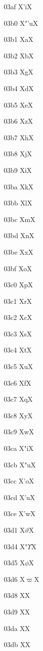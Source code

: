 \documentclass[11pt]{article}
\begin{document}
03af X{\textgreek{'i}}X

03b0 X{\textgreek{"'u}}X

03b1 X{\textgreek{a}}X

03b2 X{\textgreek{b}}X

03b3 X{\textgreek{g}}X

03b4 X{\textgreek{d}}X

03b5 X{\textgreek{e}}X

03b6 X{\textgreek{z}}X

03b7 X{\textgreek{h}}X

03b8 X{\textgreek{j}}X

03b9 X{\textgreek{i}}X

03ba X{\textgreek{k}}X

03bb X{\textgreek{l}}X

03bc X{\textgreek{m}}X

03bd X{\textgreek{n}}X

03be X{\textgreek{x}}X

03bf X{\textgreek{o}}X

03c0 X{\textgreek{p}}X

03c1 X{\textgreek{r}}X

03c2 X{\textgreek{c}}X

03c3 X{\textgreek{s}}X

03c4 X{\textgreek{t}}X

03c5 X{\textgreek{u}}X

03c6 X{\textgreek{f}}X

03c7 X{\textgreek{q}}X

03c8 X{\textgreek{y}}X

03c9 X{\textgreek{w}}X

03ca X{\textgreek{"i}}X

03cb X{\textgreek{"u}}X

03cc X{\textgreek{'o}}X

03cd X{\textgreek{'u}}X

03ce X{\textgreek{'w}}X

03d1 X{\ensuremath{\vartheta}}X

03d4 X{\textgreek{"\ensuremath{\Upsilon}}}X

03d5 X{\ensuremath{\phi}}X

03d6 X{\ensuremath{\varpi}}X

03d8 X{\textgreek{\Koppa}}X

03d9 X{\textgreek{\coppa}}X

03da X{\textgreek{\Stigma}}X

03db X{\textgreek{\stigma}}X
\end{document}
